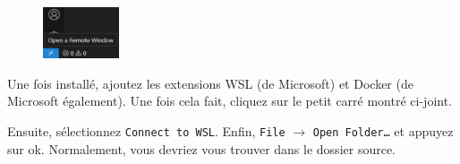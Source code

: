     \begin{figure}
        \centering
        \vspace*{-0.5cm}
        \includegraphics[width=0.2\textwidth]{Images_formation/connect_to_wsl.pdf}
    \end{figure}
    Une fois \vscode{} installé, ajoutez les extensions WSL (de Microsoft) et Docker (de Microsoft également). Une fois cela fait, cliquez sur le petit carré montré ci-joint.

    Ensuite, sélectionnez \verb|Connect to WSL|. Enfin, \texttt{File} $\rightarrow$ \texttt{Open Folder\ldots} et appuyez sur ok. Normalement, vous devriez vous trouver dans le dossier source.
